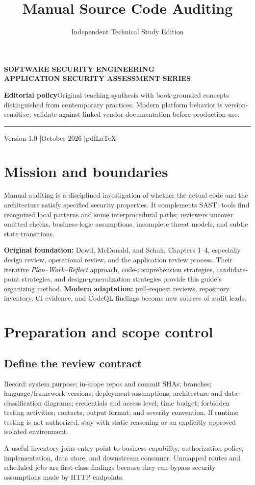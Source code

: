 \documentclass[
  letterpaper,
]{article}
\title{Manual Source Code Auditing}
\author{Independent Technical Study Edition}
\date{}
\makeatletter
\renewcommand{\maketitle}{%
 \hypersetup{pageanchor=false}%
\begin{titlepage}\thispagestyle{empty}
 \vspace*{1.5cm}{\color{brand}\rule{\textwidth}{3pt}}\par\vspace{1cm}
 {\sffamily\bfseries\color{muted}\large SOFTWARE SECURITY ENGINEERING\\ APPLICATION SECURITY ASSESSMENT SERIES}\par\vspace{1.05cm}
 {\sffamily\bfseries\color{ink}\fontsize{27}{34}\selectfont\@title\par}\vspace{0.8cm}
 {\sffamily\large\color{brand}\@author\par}\vfill
 \begin{tcolorbox}[colback=brandlight,colframe=brand!55,boxrule=0.5pt]
 \small\textbf{Editorial policy}\quad Original teaching synthesis with book-grounded concepts distinguished from contemporary practices. Modern platform behavior is version-sensitive; validate against linked vendor documentation before production use.
 \end{tcolorbox}
 {\color{brand}\rule{\textwidth}{2pt}}\par\vspace{0.3cm}
 {\sffamily\small Version 1.0 \quad|\quad October 2026 \quad|\quad pdfLaTeX}\end{titlepage}\hypersetup{pageanchor=true}\setcounter{page}{1}}
\makeatother
\begin{document}
\maketitle

{
\setcounter{tocdepth}{3}
\tableofcontents
}
\section{Mission and boundaries}\label{mission-and-boundaries}

Manual auditing is a disciplined investigation of whether the actual
code and the architecture satisfy specified security properties. It
complements SAST: tools find recognized local patterns and some
interprocedural paths; reviewers uncover omitted checks, business-logic
assumptions, incomplete threat models, and subtle state transitions.

\textbf{Original foundation:} Dowd, McDonald, and Schuh, Chapters 1--4,
especially design review, operational review, and the application review
process. Their iterative \emph{Plan--Work--Reflect} approach,
code-comprehension strategies, candidate-point strategies, and
design-generalization strategies provide this guide's organizing method.
\textbf{Modern adaptation:} pull-request reviews, repository inventory,
CI evidence, and CodeQL findings become new sources of audit leads.

\section{Preparation and scope
control}\label{preparation-and-scope-control}

\subsection{Define the review
contract}\label{define-the-review-contract}

Record: system purpose; in-scope repos and commit SHAs; branches;
language/framework versions; deployment assumptions; architecture and
data-classification diagrams; credentials and access level; time budget;
forbidden testing activities; contacts; output format; and severity
convention. If runtime testing is not authorized, stay with static
reasoning or an explicitly approved isolated environment.

A useful inventory joins entry point to business capability,
authorization policy, implementation, data store, and downstream
consumer. Unmapped routes and scheduled jobs are first-class findings
because they can bypass security assumptions made by HTTP endpoints.
\end{document}

